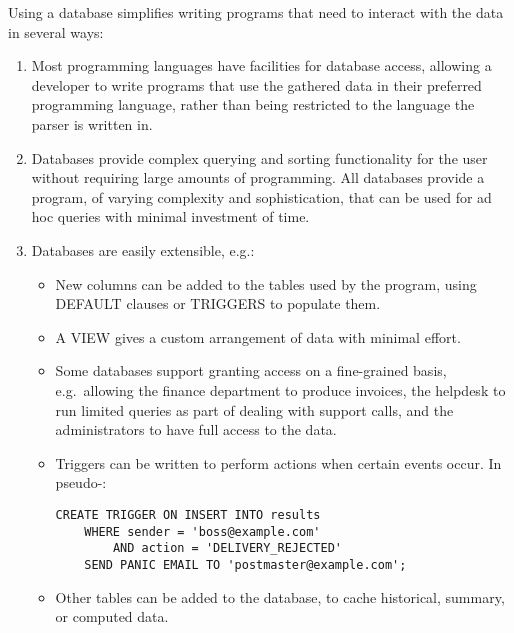 Using a database simplifies writing programs that need to interact with the
data in several ways:

\begin{enumerate}

    \item Most programming languages have facilities for database access,
        allowing a developer to write programs that use the gathered data
        in their preferred programming language, rather than being
        restricted to the language the parser is written in.

    \item Databases provide complex querying and sorting functionality for
        the user without requiring large amounts of programming.  All
        databases provide a program, of varying complexity and
        sophistication, that can be used for ad hoc queries with minimal
        investment of time.

    \item Databases are easily extensible, e.g.:

        \begin{itemize}

            \item New columns can be added to the tables used by the
                program, using DEFAULT clauses or TRIGGERS to populate
                them.

            \item A VIEW gives a custom arrangement of data with minimal
                effort.

            \item Some databases support granting access on a fine-grained
                basis, e.g.\ allowing the finance department to produce
                invoices, the helpdesk to run limited queries as part of
                dealing with support calls, and the administrators to have
                full access to the data.

            \item Triggers can be written to perform actions when certain
                events occur.  In pseudo-\@:

\begin{verbatim}
CREATE TRIGGER ON INSERT INTO results
    WHERE sender = 'boss@example.com'
        AND action = 'DELIVERY_REJECTED'
    SEND PANIC EMAIL TO 'postmaster@example.com';
\end{verbatim}

            \item Other tables can be added to the database, to cache
                historical, summary, or computed data.


\end{itemize}
\end{enumerate}

